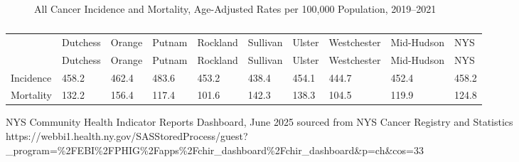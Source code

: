 \documentclass[
  english,
  letterpaper,
]{report}
\begin{document}
\begin{figure}


\caption{\label{fig-allca-incident-mortal-aar}All Cancer Incidence and
Mortality, Age-Adjusted Rates per 100,000 Population, 2019--2021}

\end{figure}%

\begin{longtable}[]{@{}llllllllll@{}}

\caption{\label{tbl-allca-incident-mortal-aar}All Cancer Incidence and
Mortality, Age-Adjusted Rates per 100,000 Population, 2019--2021}

\tabularnewline

\caption{}\label{T_1bf74}\tabularnewline
\toprule\noalign{}
& Dutchess & Orange & Putnam & Rockland & Sullivan & Ulster &
Westchester & Mid-Hudson & NYS \\
\midrule\noalign{}
\endfirsthead
\toprule\noalign{}
& Dutchess & Orange & Putnam & Rockland & Sullivan & Ulster &
Westchester & Mid-Hudson & NYS \\
\midrule\noalign{}
\endhead
\bottomrule\noalign{}
\endlastfoot
Incidence & 458.2 & 462.4 & 483.6 & 453.2 & 438.4 & 454.1 & 444.7 &
452.4 & 458.2 \\
Mortality & 132.2 & 156.4 & 117.4 & 101.6 & 142.3 & 138.3 & 104.5 &
119.9 & 124.8 \\

\end{longtable}

\begin{tcolorbox}[enhanced jigsaw, breakable, leftrule=.75mm, title=\textcolor{quarto-callout-note-color}{\faInfo}\hspace{0.5em}{Source}, bottomrule=.15mm, opacityback=0, left=2mm, colback=white, bottomtitle=1mm, coltitle=black, colbacktitle=quarto-callout-note-color!10!white, colframe=quarto-callout-note-color-frame, opacitybacktitle=0.6, toptitle=1mm, titlerule=0mm, arc=.35mm, rightrule=.15mm, toprule=.15mm]

NYS Community Health Indicator Reports Dashboard, June 2025 sourced from
NYS Cancer Registry and Statistics
https://webbi1.health.ny.gov/SASStoredProcess/guest?\_program=\%2FEBI\%2FPHIG\%2Fapps\%2Fchir\_dashboard\%2Fchir\_dashboard\&p=ch\&cos=33

\end{tcolorbox}
\end{document}
